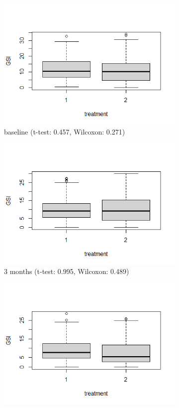 \begin{figure}[H]
\begin{subfigure}{.19\textwidth}
  \includegraphics[width=1\linewidth]{../../plots/box_between_group_0.png}
  \caption{baseline (t-test: 0.457, Wilcoxon: 0.271)}
\end{subfigure}
\begin{subfigure}{.19\textwidth}
  \includegraphics[width=1\linewidth]{../../plots/box_between_group_3.png}
  \caption{3 months (t-test: 0.995, Wilcoxon: 0.489)}
\end{subfigure}
\begin{subfigure}{.19\textwidth}
  \includegraphics[width=1\linewidth]{../../plots/box_between_group_6.png}

\end{subfigure}
\end{figure}
